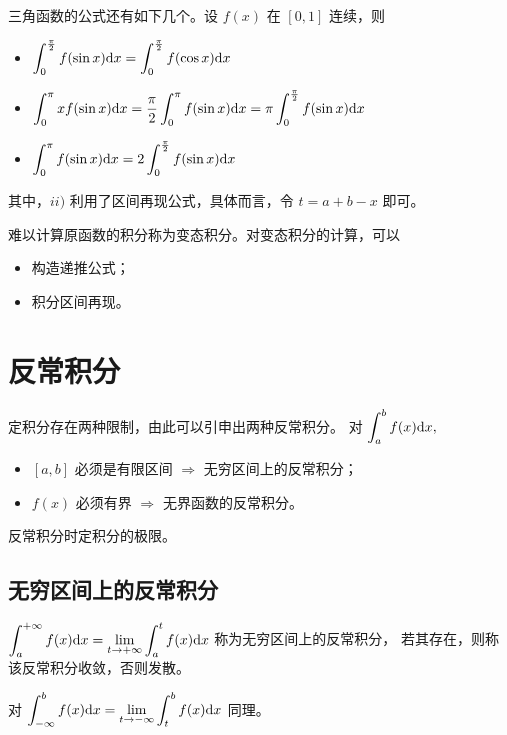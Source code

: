 三角函数的公式还有如下几个。设 $ f(x) $ 在 $ [0,1] $ 连续，则
\begin{itemize}
    \item $ \displaystyle \int_0^\frac{\pi}{2} f(\sin x)\mathrm{d}x=\int_0^\frac{\pi}{2} f(\cos x)\mathrm{d}x $ 
    \item $\displaystyle \int_0^\pi xf(\sin x)\mathrm{d}x = \dfrac{\pi}2\int_0^\pi f(\sin x)\mathrm{d}x = 
    \pi\int_0^\frac{\pi}{2} f(\sin x)\mathrm{d}x $ 
    \item $\displaystyle \int_0^{\pi} f(\sin x)\mathrm{d}x = 2\int_0^\frac{\pi}{2} f(\sin x)\mathrm{d}x $ 
\end{itemize}

其中，$ ii) $ 利用了区间再现公式，具体而言，令 $ t = a + b - x $ 即可。

难以计算原函数的积分称为变态积分。对变态积分的计算，可以
\begin{itemize}
    \item 构造递推公式；
    \item 积分区间再现。
\end{itemize}

\section{反常积分}

定积分存在两种限制，由此可以引申出两种反常积分。
对 $ \displaystyle \int_a^b f(x)\mathrm{d}x, $ 
\begin{itemize}
    \item $ [a,b] $ 必须是有限区间 $ \Rightarrow $ 无穷区间上的反常积分；
    \item $ f(x) $ 必须有界 $ \Rightarrow $ 无界函数的反常积分。
\end{itemize}

反常积分时定积分的极限。

\subsection{无穷区间上的反常积分}

$ \displaystyle \int_a^{+\infty}f(x)\mathrm{d}x = {\displaystyle\lim_{t\rightarrow +\infty}}
\int_a^t f(x)\mathrm{d}x $ 称为无穷区间上的反常积分，
若其存在，则称该反常积分收敛，否则发散。\vspace{3pt}

对 $ \displaystyle \int_{-\infty}^b f(x)\mathrm{d}x = {\displaystyle\lim_{t\rightarrow -\infty}}
\int_t^b f(x)\mathrm{d}x $ 同理。\vspace{3pt}

